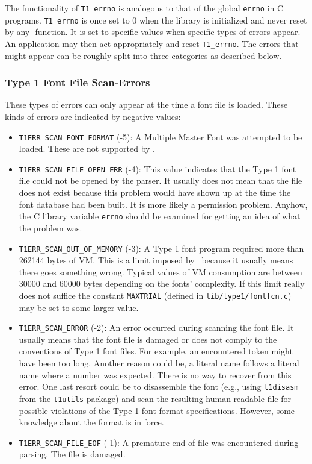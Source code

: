 The functionality of \verb+T1_errno+ is analogous to that of the global
\verb+errno+ in C programs. \verb+T1_errno+ is once set to 0 when the library
is initialized and never reset by any \tonelib-function. It is set to specific
values when specific types of errors appear. An application may then act
appropriately and reset \verb+T1_errno+.
The errors that might appear can be roughly split into three categories as
described below.

\subsubsection{Type 1 Font File Scan-Errors}
These types of errors can only appear at the time a font file is loaded.
These kinds of errors are indicated by negative values:
\begin{itemize}
\item \verb+T1ERR_SCAN_FONT_FORMAT+ (-5): A Multiple Master Font was attempted
  to be loaded. These are not supported by \tonelib.
\item \verb+T1ERR_SCAN_FILE_OPEN_ERR+ (-4): This value indicates that the Type
  1 font file could not be opened by the parser. It usually does not mean that
  the file does not exist because this problem would have shown up at the time
  the font database had been built. It is more likely a permission problem.
  Anyhow, the C library variable \verb+errno+ should be examined for getting
  an idea of what the problem was.
\item \verb+T1ERR_SCAN_OUT_OF_MEMORY+ (-3): A Type 1 font program required
  more than 262144 bytes of VM. This is a limit imposed by \tonelib\ because
  it usually means there goes something wrong. Typical values of VM
  consumption are between 30000 and 60000 bytes depending on the fonts'
  complexity. If this limit really does not suffice the constant
  \verb+MAXTRIAL+ (defined in \verb+lib/type1/fontfcn.c+) may be set to some
  larger value. 
\item \verb+T1ERR_SCAN_ERROR+ (-2): An error occurred during scanning the font
  file. It usually means that the font file is damaged or does not comply to
  the conventions of Type 1 font files. For example, an encountered token might
  have been too long. Another reason could be, a literal name follows a literal
  name where a number was expected. There is no way to recover from this
  error. One last resort could be to disassemble the font (e.g., using
  \verb+t1disasm+ from the \verb+t1utils+ package) and scan the resulting
  human-readable file for possible violations of the Type 1 font format
  specifications. However, some knowledge about the format is in force.
\item \verb+T1ERR_SCAN_FILE_EOF+ (-1): A premature end of file was encountered
  during parsing. The file is damaged.
\end{itemize}


